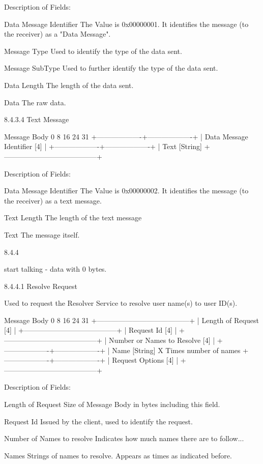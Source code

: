 \documentclass[titlepage,oneside]{book}
\begin{document}
Description of Fields:

Data Message Identifier
  The Value is 0x00000001. It identifies the message (to the
  receiver) as a "Data Message".

Message Type
  Used to identify the type of the data sent.

Message SubType
  Used to further identify the type of the data sent.

Data Length
  The length of the data sent.

Data
  The raw data.

8.4.3.4 Text Message

Message Body
0         8         16        24      31
+-------------------+-------------------+
|     Data Message Identifier [4]       |
+-------------------+-------------------+
|        Text [String]
+---------------------------------------+

Description of Fields:

Data Message Identifier
  The Value is 0x00000002. It identifies the message (to the
  receiver) as a text message.

Text Length
  The length of the text message

Text
  The message itself.

8.4.4

start talking - data with 0 bytes.

8.4.4.1 Resolve Request

Used to request the Resolver Service to resolve user name(s) to user
ID(s).

Message Body
0         8         16        24      31
+---------------------------------------+
|       Length of Request [4]      |
+---------------------------------------+
|            Request Id [4]             |
+---------------------------------------+
|    Number or Names to Resolve [4]     |
+-------------------+-------------------+
| Name [String]                            X Times number of names
+-------------------+-------------------+
|            Request Options [4]        |
+---------------------------------------+

Description of Fields:

Length of Request
  Size of Message Body in bytes including this field.

Request Id
  Issued by the client, used to identify the request.

Number of Names to resolve
  Indicates how much names there are to follow...

Names
  Strings of names to resolve. Appears as times as indicated before.
\end{document}

